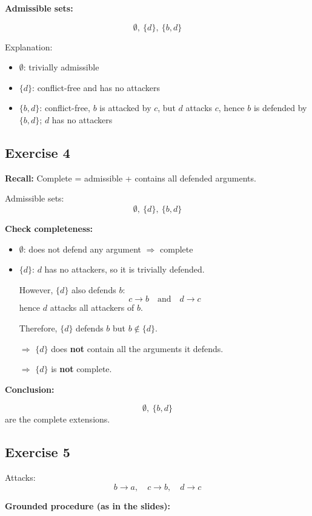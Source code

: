 \documentclass[11pt]{article}
\begin{document}
\textbf{Admissible sets:}

\[
\emptyset,\ \{d\},\ \{b, d\}
\]

Explanation:
\begin{itemize}
    \item $\emptyset$: trivially admissible
    \item $\{d\}$: conflict-free and has no attackers
    \item $\{b, d\}$: conflict-free, $b$ is attacked by $c$, but $d$ attacks $c$, hence $b$ is defended by $\{b,d\}$; $d$ has no attackers
\end{itemize}

\subsection{Exercise 4}

\textbf{Recall:} Complete = admissible + contains all defended arguments.

Admissible sets:
\[
\emptyset,\ \{d\},\ \{b, d\}
\]

\textbf{Check completeness:}

\begin{itemize}
    \item $\emptyset$:
    does not defend any argument $\Rightarrow$ complete

    \item $\{d\}$:
    $d$ has no attackers, so it is trivially defended.

    However, $\{d\}$ also defends $b$:
    \[
    c \to b \quad \text{and} \quad d \to c
    \]
    hence $d$ attacks all attackers of $b$.

    Therefore, $\{d\}$ defends $b$ but $b \notin \{d\}$.

    $\Rightarrow$ $\{d\}$ does \textbf{not} contain all the arguments it defends.

    $\Rightarrow$ $\{d\}$ is \textbf{not} complete.
\end{itemize}

\textbf{Conclusion:}

\[
    \emptyset,\ \{b, d\}
\]
are the complete extensions.

\subsection{Exercise 5}

Attacks:
\[
b \to a,\quad c \to b,\quad d \to c
\]

\textbf{Grounded procedure (as in the slides):}
\end{document}
